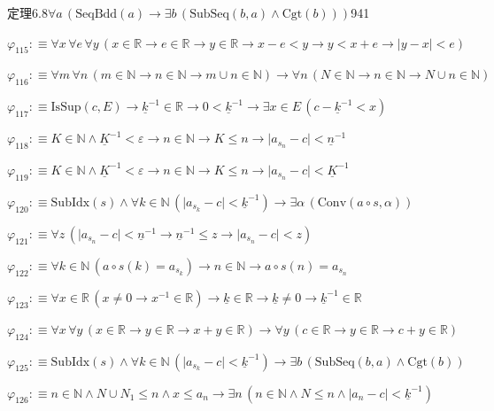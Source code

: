 \begin{fullproof}{定理6.8}{$\forall a\,(\mathrm{SeqBdd}(a) \to \exists b\,(\mathrm{SubSeq}(b,a) \land \mathrm{Cgt}(b)))$}{941}
\begin{abbrevlist}
\item $\varphi_{115} :\equiv \forall x\,\forall e\,\forall y\,(x \in \mathbb{R} \to e \in \mathbb{R} \to y \in \mathbb{R} \to x - e < y \to y < x + e \to \lvert y - x \rvert < e)$
\item $\varphi_{116} :\equiv \forall m\,\forall n\,(m \in \mathbb{N} \to n \in \mathbb{N} \to m \cup n \in \mathbb{N}) \to \forall n\,(N \in \mathbb{N} \to n \in \mathbb{N} \to N \cup n \in \mathbb{N})$
\item $\varphi_{117} :\equiv \mathrm{IsSup}(c,E) \to \underline{k}^{-1} \in \mathbb{R} \to 0 < \underline{k}^{-1} \to \exists x \in E\,(c - \underline{k}^{-1} < x)$
\item $\varphi_{118} :\equiv K \in \mathbb{N} \land \underline{K}^{-1} < \varepsilon \to n \in \mathbb{N} \to K \leq n \to \lvert a_{s_{n}} - c \rvert < \underline{n}^{-1}$
\item $\varphi_{119} :\equiv K \in \mathbb{N} \land \underline{K}^{-1} < \varepsilon \to n \in \mathbb{N} \to K \leq n \to \lvert a_{s_{n}} - c \rvert < \underline{K}^{-1}$
\item $\varphi_{120} :\equiv \mathrm{SubIdx}(s) \land \forall k \in \mathbb{N}\,(\lvert a_{s_{k}} - c \rvert < \underline{k}^{-1}) \to \exists \alpha\,(\mathrm{Conv}(a \circ s,\alpha))$
\item $\varphi_{121} :\equiv \forall z\,(\lvert a_{s_{n}} - c \rvert < \underline{n}^{-1} \to \underline{n}^{-1} \leq z \to \lvert a_{s_{n}} - c \rvert < z)$
\item $\varphi_{122} :\equiv \forall k \in \mathbb{N}\,(a \circ s(k) = a_{s_{k}}) \to n \in \mathbb{N} \to a \circ s(n) = a_{s_{n}}$
\item $\varphi_{123} :\equiv \forall x \in \mathbb{R}\,(x \neq 0 \to x^{-1} \in \mathbb{R}) \to \underline{k} \in \mathbb{R} \to \underline{k} \neq 0 \to \underline{k}^{-1} \in \mathbb{R}$
\item $\varphi_{124} :\equiv \forall x\,\forall y\,(x \in \mathbb{R} \to y \in \mathbb{R} \to x + y \in \mathbb{R}) \to \forall y\,(c \in \mathbb{R} \to y \in \mathbb{R} \to c + y \in \mathbb{R})$
\item $\varphi_{125} :\equiv \mathrm{SubIdx}(s) \land \forall k \in \mathbb{N}\,(\lvert a_{s_{k}} - c \rvert < \underline{k}^{-1}) \to \exists b\,(\mathrm{SubSeq}(b,a) \land \mathrm{Cgt}(b))$
\item $\varphi_{126} :\equiv n \in \mathbb{N} \land N \cup N_{1} \leq n \land x \leq a_{n} \to \exists n\,(n \in \mathbb{N} \land N \leq n \land \lvert a_{n} - c \rvert < \underline{k}^{-1})$

\end{abbrevlist}
\end{fullproof}
